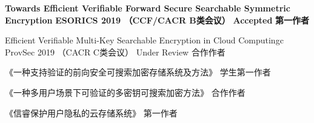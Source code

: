 \documentclass[zh]{resume}
\begin{document}
\begin{myresearchs}
  \myresearch
    {\textbf{Towards Efficient Verifiable Forward Secure Searchable Symmetric Encryption}}
    {\textbf{ESORICS 2019 （CCF/CACR B类会议）}}
    {\textbf{Accepted}}
    {\textbf{第一作者}}%

  \myresearch
    {Efficient Verifiable Multi-Key Searchable Encryption in Cloud Computingc}
    {ProvSec 2019 （CACR C类会议）}
    {Under Review}
    {合作作者}
    
  \myzhuanli
    {《一种支持验证的前向安全可搜索加密存储系统及方法》}
    {学生第一作者}
  
  \myzhuanli
    {《一种多用户场景下可验证的多密钥可搜索加密方法》}
    {合作作者}
    
  \myruanzhu
    {《信睿保护用户隐私的云存储系统》}
    {第一作者}

\end{myresearchs}
\end{document}
